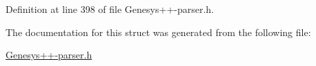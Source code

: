 Definition at line 398 of file Genesys++-\/parser.\-h.



The documentation for this struct was generated from the following file\-:\begin{DoxyCompactItemize}
\item 
\hyperlink{_genesys_09_09-parser_8h}{Genesys++-\/parser.\-h}\end{DoxyCompactItemize}
